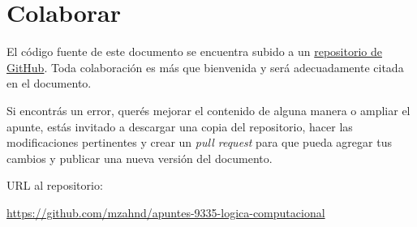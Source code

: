 \chapter{Colaborar}

El código fuente de este documento se encuentra subido a un 
\href{%
https://github.com/mzahnd/apuntes-9335-logica-computacional
}{repositorio de GitHub}.
Toda colaboración es más que bienvenida y será adecuadamente citada en el
documento.

Si encontrás un error, querés mejorar el contenido de alguna manera o ampliar
el apunte, estás invitado a descargar una copia del repositorio, hacer las
modificaciones pertinentes y crear un \textit{pull request} para que pueda
agregar tus cambios y publicar una nueva versión del documento.

\bigskip

URL al repositorio: 

\smallskip

\href{https://github.com/mzahnd/apuntes-9335-logica-computacional}{%
https://github.com/mzahnd/apuntes-9335-logica-computacional
}
